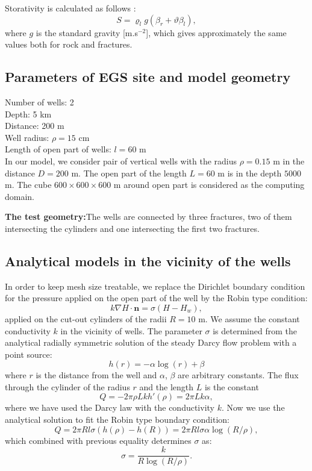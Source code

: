 \documentclass{article}
\newcommand{\eq}[1]{\begin{equation}#1\end{equation}}
\newcommand{\nn}{\vc n}
\newcommand{\vc}[1]{\boldsymbol{#1}}
\begin{document}
Storativity is calculated as follows \cite{brace-et-al}:
\[ S = \varrho_l g(\beta_r + \vartheta\beta_l), \]
where $g$ is the standard gravity [m.s${}^{-2}$], which gives approximately the same values both for rock and fractures.

\subsection{Parameters of EGS site and model geometry}

Number of wells: 2 \\
Depth: 5 km \\
Distance: 200 m \\
Well radius: $\rho = 15$ cm \\
Length of open part of wells: $l=60$ m \\



In our model, we consider pair of vertical wells with the radius $\rho=0.15$ m in the distance $D=200$ m. The open part of the length $L=60$ m is in the depth $5000$ m. The cube $600 \times 600 \times 600$ m around open part is considered as the computing domain. 

{\bf The test geometry:}The wells are connected by three fractures, two of them intersecting the cylinders and one intersecting the first two fractures.

\subsection{Analytical models in the vicinity of the wells}
In order to keep mesh size treatable, we replace the Dirichlet boundary condition for the pressure applied on the open part of the well by the Robin type condition:
%
\eq{\label{eq:H_robin} k\nabla H\cdot\nn = \sigma(H-H_w), }
%
applied on the cut-out cylinders of the radii $R=10$ m. We assume the constant conductivity $k$ in the vicinity of wells. The parameter $\sigma$ is determined from the analytical radially symmetric solution
of the steady Darcy flow problem with a point source:
\[
    h(r) = -\alpha \log (r) + \beta
\]
where $r$ is the distance from the well and $\alpha$, $\beta$ are arbitrary constants.
The flux through the cylinder of the radius $r$ and the length $L$ is the constant
\[  
    Q = -2\pi \rho L k h'(\rho) = 2\pi L k \alpha,
\]
where we have used the Darcy law with the conductivity $k$. Now we use the analytical solution to fit the Robin type boundary condition:
\[
    Q = 2\pi R l \sigma (h(\rho) - h(R)) = 2\pi R l \sigma \alpha \log(R/\rho),
\]
which combined with previous equality determines $\sigma$ as:
\[ 
    \sigma = \frac{k}{R\log(R/\rho)}.
\]
\end{document}
